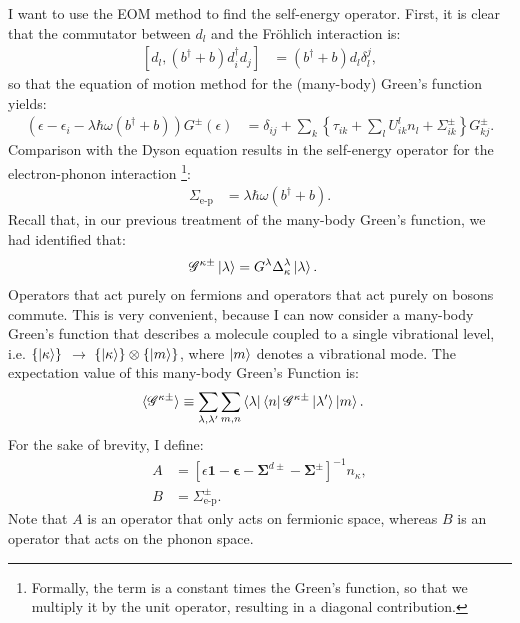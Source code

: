 I want to use the EOM method to find the self-energy operator. First, it is clear that the commutator between $d_l$ and the Fr\"ohlich interaction is:
\begin{align*}
 \left[ d_l, (b^\dagger + b) d_i^\dagger d_j \right] &= (b^\dagger + b) d_l \delta^j_l,
\end{align*}
so that the equation of motion method for the (many-body) Green's function yields:
\begin{align*}
\left(\epsilon-\epsilon_i - \lambda \hbar \omega \left(b^\dagger + b\right) \right) G^\pm (\epsilon) &= \delta_{ij} + \sum_k \left\{ \tau_{ik} + \sum_l U^l_{ik} n_l + \Sigma^\pm_{ik} \right\} G^\pm_{kj}.
\end{align*}
Comparison with the Dyson equation results in the self-energy operator for the electron-phonon interaction \footnote{Formally, the term is a constant times the Green's function, so that we multiply it by the unit operator, resulting in a diagonal contribution.}:
\begin{align*}
\Sigma_\text{e-p} &= \lambda \hbar \omega ( b^\dagger + b).
\end{align*}
Recall that, in our previous treatment of the many-body Green's function, we had identified that:
\begin{align*}
\mathscr{G}^{\kappa\pm} \ket{\lambda} &= G^\lambda \Delta^\lambda_\kappa \ket{\lambda}.
\end{align*}
Operators that act purely on fermions and operators that act purely on bosons commute. This is very convenient, because I can now consider a many-body Green's function that describes a molecule coupled to a single vibrational level, i.e. $\left\{\ket{\kappa}\right\} $ $\rightarrow$ $ \left\{\ket{\kappa}\right\} \otimes \left\{\ket{m}\right\}$, where $\ket{m}$ denotes a vibrational mode. The expectation value of this many-body Green's Function is:
\begin{align*}
\braket{\mathscr{G}^{\kappa\pm}} &\equiv \sum_{\lambda, \lambda^\prime} \sum_{m,n} \bra{\lambda}\bra{n} \mathscr{G}^{\kappa\pm} \ket{\lambda^\prime}\ket{m} .
\end{align*}
For the sake of brevity, I define:
\begin{align*}
A &=\left[ \epsilon \mathbf{1} - \mathbf{\epsilon} - \mathbf{\Sigma}^{d\pm} - \mathbf{\Sigma}^\pm \right]^{-1} n_\kappa, \\
B &= \Sigma^\pm_\text{e-p}.
\end{align*}
Note that $A$ is an operator that only acts on fermionic space, whereas $B$ is an operator that acts on the phonon space. 

